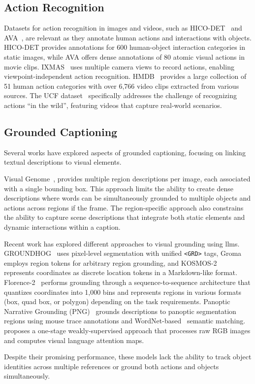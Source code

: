     \subsection{Action Recognition}\label{subsec:action-recognition}

    Datasets for action recognition in images and videos, such as HICO-DET~\cite{chao2018learning} and AVA~\cite{gu2018ava},
    are relevant as they annotate human actions and interactions with objects.
    HICO-DET provides annotations for 600 human-object interaction categories in static images, while AVA offers
    dense annotations of 80 atomic visual actions in movie clips.
    IXMAS~\cite{weinland2006free} uses multiple camera views to
    record actions, enabling viewpoint-independent action recognition.
    HMDB~\cite{hilde2011hmdb} provides a large collection of 51 human action categories with
    over 6,766 video clips extracted from various sources.
    The UCF dataset~\cite{liu2009recognizing} specifically addresses the challenge of recognizing actions ``in the wild'',
    featuring videos that capture real-world scenarios.

    \subsection{Grounded Captioning}\label{subsec:grounded-captioning}
    Several works have explored aspects of grounded captioning, focusing on linking textual descriptions to visual elements.

    Visual Genome~\cite{krishna2017visual}, provides multiple region descriptions per image, each associated with a single bounding box.
    This approach limits the ability to create dense descriptions where words can be simultaneously grounded to multiple objects and actions across regions if the frame.
    The region-specific approach also constrains the ability to capture scene descriptions that integrate both static elements and dynamic interactions within a caption.

    Recent work has explored different approaches to visual grounding using \glspl{llm}.
    GROUNDHOG~\cite{zhang2024groundhog} uses pixel-level segmentation with unified \texttt{<GRD>} tags,
    Groma~\cite{ma2024groma} employs region tokens for arbitrary region grounding,
    and KOSMOS-2~\cite{peng2023kosmos} represents coordinates as discrete location tokens in a Markdown-like format.
    Florence-2~\cite{xiao2023Florence2AA} performs grounding through a sequence-to-sequence architecture that quantizes
    coordinates into 1,000 bins and represents regions in various formats (box, quad box, or polygon) depending on the task
    requirements.
    Panoptic Narrative Grounding (PNG)~\cite{gonzalez2021panoptic} grounds descriptions to panoptic segmentation regions
    using mouse trace annotations and WordNet-based~\cite{wordnet1994} semantic matching.
    \cite{cai2024top} proposes a one-stage weakly-supervised approach that processes raw RGB images and computes visual language attention maps.

    Despite their promising performance, these models lack the ability to track object identities across multiple references
    or ground both actions and objects simultaneously.